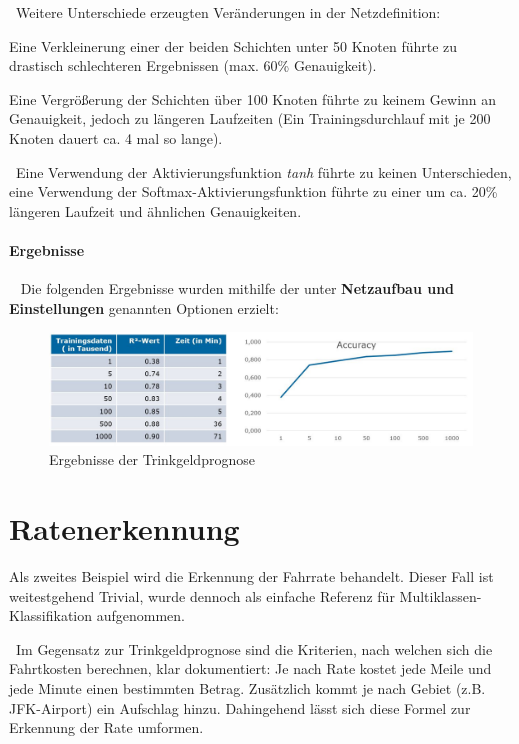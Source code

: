 ~\newline Weitere Unterschiede erzeugten Veränderungen in der Netzdefinition: 

Eine Verkleinerung einer der beiden Schichten unter 50 Knoten führte zu drastisch schlechteren Ergebnissen (max. 60\% Genauigkeit). 

Eine Vergrößerung der Schichten über 100 Knoten führte zu keinem Gewinn an Genauigkeit, jedoch zu längeren Laufzeiten (Ein Trainingsdurchlauf mit je 200 Knoten dauert ca. 4 mal so lange).

~\newline Eine Verwendung der Aktivierungsfunktion \textit{tanh} führte zu keinen Unterschieden, eine Verwendung der Softmax-Aktivierungsfunktion führte zu einer um ca. 20\% längeren Laufzeit und ähnlichen Genauigkeiten. 
\paragraph{Ergebnisse} ~\newline
Die folgenden Ergebnisse wurden mithilfe der unter \textbf{Netzaufbau und Einstellungen} genannten Optionen erzielt:

\begin{figure}[h]
	\begin{center}
		\includegraphics[width=0.95\linewidth]{Bilder/TrinkgeldErgebnisse}
		\caption[Ergebnisse der Trinkgeldprognose]{Ergebnisse der Trinkgeldprognose}
		\label{fig:TipErg}
	\end{center}
\end{figure}

\newpage
\section{Ratenerkennung}
\label{sec:RatePred}
Als zweites Beispiel wird die Erkennung der Fahrrate behandelt. Dieser Fall ist weitestgehend Trivial, wurde dennoch als einfache Referenz für Multiklassen-Klassifikation aufgenommen. 

~\newline Im Gegensatz zur Trinkgeldprognose sind die Kriterien, nach welchen sich die Fahrtkosten berechnen, klar dokumentiert: Je nach Rate kostet jede Meile und jede Minute einen bestimmten Betrag. Zusätzlich kommt je nach Gebiet (z.B. JFK-Airport) ein Aufschlag hinzu. Dahingehend lässt sich diese Formel zur Erkennung der Rate umformen.

